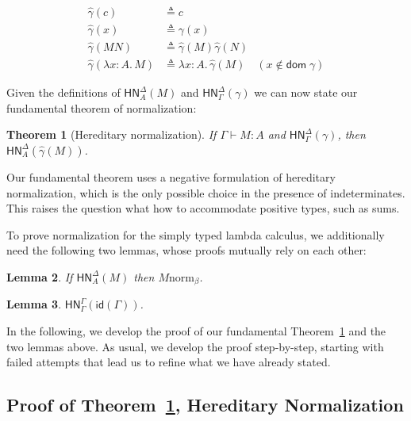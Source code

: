 \documentclass{article}
\newtheorem{thm}{Theorem}
\newtheorem{lem}[thm]{Lemma}
\newcommand{\hasEF}[3]{\ensuremath{#1 \vdash #2 : #3}}
\newcommand{\bnorm}[1]{\ensuremath{#1 \mathrel{\text{norm}_\beta}}}
\newcommand{\hnorm}[3]{\ensuremath{\mathsf{HN}^{#1}_{#2}(#3)}}
\newcommand{\id}[1]{\ensuremath{\mathsf{id}(#1)}}
\newcommand{\lam}[3]{\ensuremath{\lambda #1 {:} #2.\, #3}}
\begin{document}
\begin{align*}
\hat{\gamma}(c) &\triangleq c\\
\hat{\gamma}(x) &\triangleq \gamma(x)\\
\hat{\gamma}(M N) &\triangleq \hat{\gamma}(M) \hat{\gamma}(N)\\
\hat{\gamma}(\lam{x}{A}{M}) &\triangleq \lam{x}{A}{\hat{\gamma}(M)} \quad (x \notin \mathsf{dom}\; \gamma)
\end{align*}

Given the definitions of $\hnorm{\Delta}{A}{M}$ and $\hnorm{\Delta}{\Gamma}{\gamma}$ we can now
state our fundamental theorem of normalization:

\begin{thm}[Hereditary normalization]\label{thm:hnorm}
If $\hasEF{\Gamma}{M}{A}$ and $\hnorm{\Delta}{\Gamma}{\gamma}$, then $\hnorm{\Delta}{A}{\hat\gamma(M)}$.
\end{thm}

Our fundamental theorem uses a negative formulation of hereditary normalization, which is the
only possible choice in the presence of indeterminates.  This raises the question what how to
accommodate positive types, such as sums.


To prove normalization for the simply typed lambda calculus, we additionally need the following
two lemmas, whose proofs mutually rely on each other:

\begin{lem}\label{l2}
If $\hnorm{\Delta}{A}{M}$ then $\bnorm{M}$.
\end{lem}

\begin{lem}\label{l3}
$\hnorm{\Gamma}{\Gamma}{\id{\Gamma}}$.
\end{lem}

In the following, we develop the proof of our fundamental Theorem~\ref{thm:hnorm} and the two
lemmas above.  As usual, we develop the proof step-by-step, starting with failed attempts that
lead us to refine what we have already stated.

\subsection{Proof of Theorem~\ref{thm:hnorm}, Hereditary Normalization}
\end{document}
